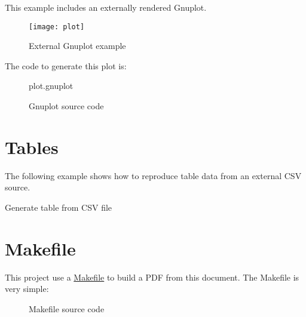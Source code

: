 \documentclass[10pt,a4paper]{article}
\begin{document}
This example includes an externally rendered Gnuplot.

\begin{figure}[h]
  \centering
  \texttt{[image: plot]}
  \caption{External Gnuplot example}
\end{figure}

The code to generate this plot is:
\begin{figure}[h]
  \begin{lstinputlisting}[language=Gnuplot]{plot.gnuplot}
  \end{lstinputlisting}
  \caption{Gnuplot source code}
\end{figure}

\sectionbreak{}

\section*{Tables}

The following example shows how to reproduce table data from an external CSV source.

\begin{table}[h]
\label{table1}
  \begin{center}
    \caption{Generate table from CSV file}
  \end{center}
\end{table}

\lipsum[3]

\sectionbreak{}

\section*{Makefile}

This project use a \href{https://www.gnu.org/software/make/}{Makefile} to build
a PDF from this document. The Makefile is very simple:

\begin{figure}[h]
  
  \caption{Makefile source code}
\end{figure}
\end{document}
